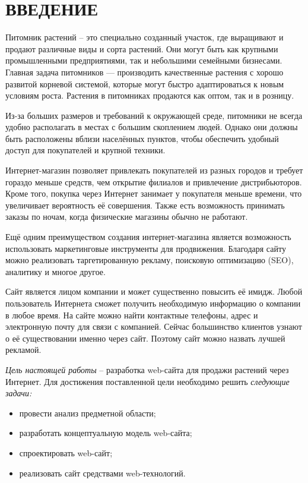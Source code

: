 \section*{ВВЕДЕНИЕ}

Питомник растений – это специально созданный участок, где выращивают и продают различные виды и сорта растений. Они могут быть как крупными промышленными предприятиями, так и небольшими семейными бизнесами. Главная задача питомников — производить качественные растения с хорошо развитой корневой системой, которые могут быстро адаптироваться к новым условиям роста. Растения в питомниках продаются как оптом, так и в розницу.

Из-за больших размеров и требований к окружающей среде, питомники не всегда удобно располагать в местах с большим скоплением людей. Однако они должны быть расположены вблизи населённых пунктов, чтобы обеспечить удобный доступ для покупателей и крупной техники.

Интернет-магазин позволяет привлекать покупателей из разных городов и требует гораздо меньше средств, чем открытие филиалов и привлечение дистрибьюторов. Кроме того, покупка через Интернет занимает у покупателя меньше времени, что увеличивает вероятность её совершения. Также есть возможность принимать заказы по ночам, когда физические магазины обычно не работают.

Ещё одним преимуществом создания интернет-магазина является возможность использовать маркетинговые инструменты для продвижения. Благодаря сайту можно реализовать таргетированную рекламу, поисковую оптимизацию (SEO), аналитику и многое другое.

Сайт является лицом компании и может существенно повысить её имидж. Любой пользователь Интернета сможет получить необходимую информацию о компании в любое время. На сайте можно найти контактные телефоны, адрес и электронную почту для связи с компанией. Сейчас большинство клиентов узнают о её существовании именно через сайт. Поэтому сайт можно назвать лучшей рекламой.

\emph{Цель настоящей работы} – разработка web-сайта для продажи растений через Интернет. Для достижения поставленной цели необходимо решить \emph{следующие задачи:}
\begin{itemize}
	\item провести анализ предметной области;
	\item разработать концептуальную модель web-сайта;
	\item спроектировать web-сайт;
	\item реализовать сайт средствами web-технологий.
\end{itemize}

